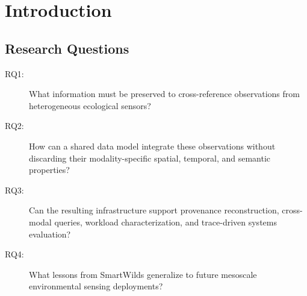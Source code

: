 \documentclass[manuscript]{acmart}
\begin{document}

\maketitle

\section{Introduction}
\label{sec:introduction}

%
%
%
%

\subsection{Research Questions}

\begin{description}
    \item[RQ1:] What information must be preserved to cross-reference
    observations from heterogeneous ecological sensors?

    \item[RQ2:] How can a shared data model integrate these
    observations without discarding their modality-specific spatial,
    temporal, and semantic properties?

    \item[RQ3:] Can the resulting infrastructure support provenance
    reconstruction, cross-modal queries, workload characterization,
    and trace-driven systems evaluation?

    \item[RQ4:] What lessons from SmartWilds generalize to future
    mesoscale environmental sensing deployments?
\end{description}
\end{document}
